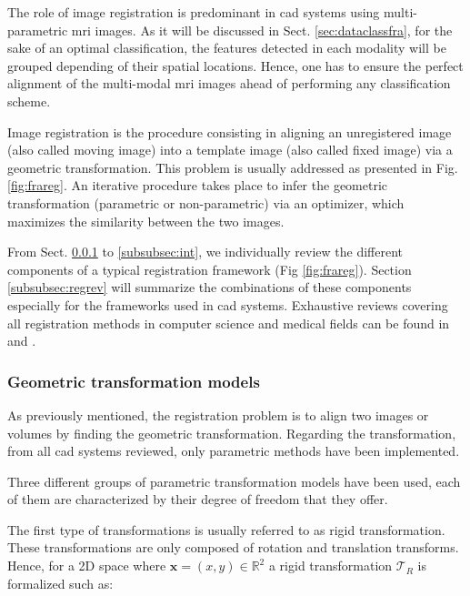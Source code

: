 The role of image registration is predominant in \ac{cad} systems using multi-parametric \ac{mri} images. As it will be discussed in Sect. \ref{sec:dataclassfra}, for the sake of an optimal classification, the features detected in each modality will be grouped depending of their spatial locations. Hence, one has to ensure the perfect alignment of the multi-modal \ac{mri} images ahead of performing any classification scheme.

Image registration is the procedure consisting in aligning an unregistered image (also called moving image) into a template image (also called fixed image) via a geometric transformation. This problem is usually addressed as presented in Fig. \ref{fig:frareg}. An iterative procedure takes place to infer the geometric transformation (parametric or non-parametric) via an optimizer, which maximizes the similarity between the two images.

From Sect. \ref{subsubsec:geotra} to \ref{subsubsec:int}, we individually review the different components of a typical registration framework (Fig \ref{fig:frareg}). Section \ref{subsubsec:regrev} will summarize the combinations of these components especially for the frameworks used in \ac{cad} systems. Exhaustive reviews covering all registration methods in computer science and medical fields can be found in \cite{Maintz1998} and \cite{Zitova2003}.

\subsubsection{Geometric transformation models}\label{subsubsec:geotra}

As previously mentioned, the registration problem is to align two images or volumes by finding the geometric transformation. Regarding the transformation, from all \ac{cad} systems reviewed, only parametric methods have been implemented.

Three different groups of parametric transformation models have been used, each of them are characterized by their degree of freedom that they offer.

The first type of transformations is usually referred to as rigid transformation. These transformations are only composed of rotation and translation transforms. Hence, for a 2D space where $\mathbf{x} = (x,y) \in \mathbb{R}^2$ a rigid transformation $\mathcal{T}_R$ is formalized such as:

